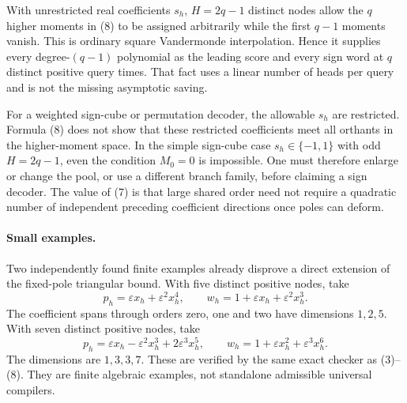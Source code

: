 \documentclass[11pt]{article}
\begin{document}
With unrestricted real coefficients $s_h$, $H=2q-1$ distinct nodes
allow the $q$ higher moments in (8) to be assigned arbitrarily while
the first $q-1$ moments vanish. This is ordinary square Vandermonde
interpolation. Hence it supplies every degree-$(q-1)$ polynomial as
the leading score and every sign word at $q$ distinct positive query
times. That fact uses a linear number of heads per query and is not
the missing asymptotic saving.

For a weighted sign-cube or permutation decoder, the allowable $s_h$
are restricted. Formula (8) does not show that these restricted
coefficients meet all orthants in the higher-moment space. In the
simple sign-cube case $s_h\in\{-1,1\}$ with odd $H=2q-1$, even the
condition $M_0=0$ is impossible. One must therefore enlarge or change
the pool, or use a different branch family, before claiming a sign
decoder. The value of (7) is that large shared order need not require
a quadratic number of independent preceding coefficient directions
once poles can deform.

\paragraph{Small examples.}
Two independently found finite examples already disprove a direct
extension of the fixed-pole triangular bound. With five distinct
positive nodes, take
\[
 p_h=\varepsilon x_h+\varepsilon^2x_h^4,
 \qquad w_h=1+\varepsilon x_h+\varepsilon^2x_h^3.
\]
The coefficient spans through orders zero, one and two have dimensions
$1,2,5$. With seven distinct positive nodes, take
\[
 p_h=\varepsilon x_h-\varepsilon^2x_h^3+2\varepsilon^3x_h^5,
 \qquad w_h=1+\varepsilon x_h^2+\varepsilon^3x_h^6.
\]
The dimensions are $1,3,3,7$. These are verified by the same exact
checker as (3)--(8). They are finite algebraic examples, not standalone
admissible universal compilers.
\end{document}
